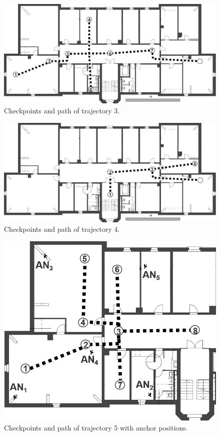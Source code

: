 \begin{figure}[th]
\centering
\includegraphics[width=1.0\textwidth]{Figures/trajectory3}
\decoRule
\caption[Trajectory 3]{Checkpoints and path of trajectory 3.}
\label{fig:trajectory3}
\end{figure}


\begin{figure}[th]
\centering
\includegraphics[width=1.0\textwidth]{Figures/trajectory4}
\decoRule
\caption[Trajectory 4]{Checkpoints and path of trajectory 4.}
\label{fig:trajectory4}
\end{figure}

\begin{figure}[th]
\centering
\includegraphics[width=1.0\textwidth]{Figures/trajectory5_withAnchors}
\decoRule
\caption[Trajectory 5]{Checkpoints and path of trajectory 5 with anchor positions.}
\label{fig:trajectory5_withAnchorsAppendix}
\end{figure}
